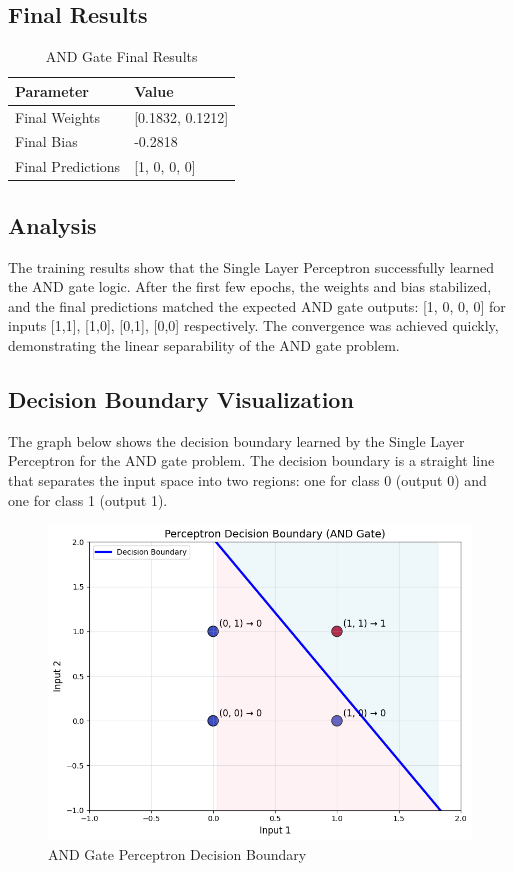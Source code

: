 \documentclass[12pt]{article}
\begin{document}
\subsection*{Final Results}
\begin{table}[H]
\centering
\caption{AND Gate Final Results}
\renewcommand{\arraystretch}{1.5}
\begin{tabular}{|l|l|}
\hline
\textbf{Parameter} & \textbf{Value} \\
\hline
Final Weights & [0.1832, 0.1212] \\
\hline
Final Bias & -0.2818 \\
\hline
Final Predictions & [1, 0, 0, 0] \\
\hline
\end{tabular}
\end{table}

\subsection*{Analysis}
The training results show that the Single Layer Perceptron successfully learned the AND gate logic. After the first few epochs, the weights and bias stabilized, and the final predictions matched the expected AND gate outputs: [1, 0, 0, 0] for inputs [1,1], [1,0], [0,1], [0,0] respectively. The convergence was achieved quickly, demonstrating the linear separability of the AND gate problem.

\subsection*{Decision Boundary Visualization}
The graph below shows the decision boundary learned by the Single Layer Perceptron for the AND gate problem. The decision boundary is a straight line that separates the input space into two regions: one for class 0 (output 0) and one for class 1 (output 1).

\begin{figure}[H]
\centering
\includegraphics[width=1.0\textwidth]{and_boundary.png}
\caption{AND Gate Perceptron Decision Boundary}
\end{figure}
\end{document}
